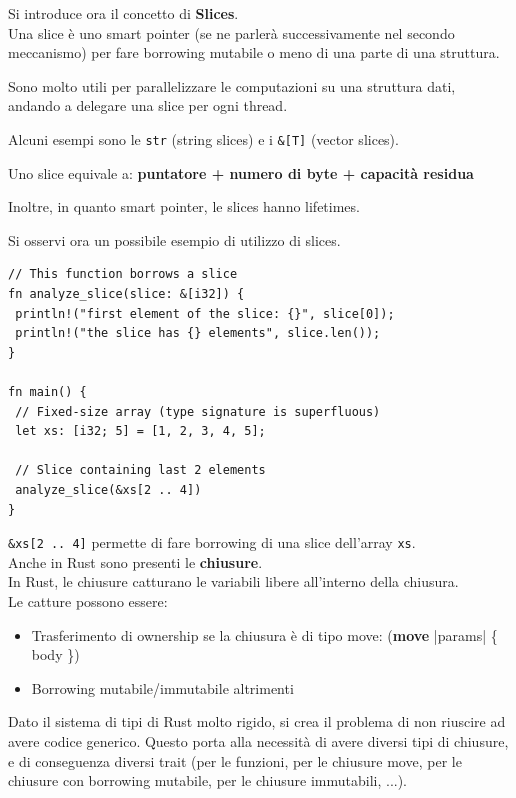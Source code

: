 \documentclass{article}
\begin{document}
\pagebreak

Si introduce ora il concetto di \textbf{Slices}.\\
Una slice è uno smart pointer (se ne parlerà successivamente nel secondo meccanismo) per fare borrowing mutabile o meno di una parte di una struttura. 

Sono molto utili per parallelizzare le computazioni su una struttura dati, andando a delegare una slice per ogni thread.

Alcuni esempi sono le \texttt{str} (string slices) e i \texttt{\&[T]} (vector slices).

Uno slice equivale a: \textbf{puntatore + numero di byte + capacità residua}

Inoltre, in quanto smart pointer, le slices hanno lifetimes.

Si osservi ora un possibile esempio di utilizzo di slices.
\begin{tcolorbox}
\begin{verbatim}
// This function borrows a slice
fn analyze_slice(slice: &[i32]) {
 println!("first element of the slice: {}", slice[0]);
 println!("the slice has {} elements", slice.len());
}

fn main() {
 // Fixed-size array (type signature is superfluous)
 let xs: [i32; 5] = [1, 2, 3, 4, 5];

 // Slice containing last 2 elements
 analyze_slice(&xs[2 .. 4])
}
\end{verbatim}
\end{tcolorbox}
\texttt{\&xs[2 .. 4]} permette di fare borrowing di una slice dell'array \texttt{xs}.\vspace{14pt}\\
Anche in Rust sono presenti le \textbf{chiusure}.\\
In Rust, le chiusure catturano le variabili libere all'interno della chiusura.\\
Le catture possono essere:
\begin{itemize}
    \item Trasferimento di ownership se la chiusura è di tipo move: (\textbf{move} |params| \{ body \})
    \item Borrowing mutabile/immutabile altrimenti
\end{itemize}
Dato il sistema di tipi di Rust molto rigido, si crea il problema di non riuscire ad avere codice generico. Questo porta alla necessità di avere diversi tipi di chiusure, e di conseguenza diversi trait (per le funzioni, per le chiusure move, per le chiusure con borrowing mutabile, per le chiusure immutabili, ...).
\end{document}
